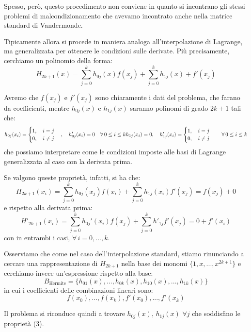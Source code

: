 \documentclass[a4paper,11pt]{article}
\begin{document}
Spesso, però, questo procedimento non conviene in quanto si incontrano gli stessi problemi di malcondizionamento che avevamo incontrato anche nella matrice standard di Vandermonde.

\par\smallskip

Tipicamente allora si procede in maniera analoga all'interpolazione di Lagrange, ma generalizzata per ottenere le condizioni sulle derivate.
Più precisamente, cerchiamo un polinomio della forma:
$$
H_{2k + 1}(x) = \sum_{j = 0}^k h_{0j}(x) f(x_j) + \sum_{j = 0}^k h_{1j}(x) + f'(x_j)
$$

Avremo che $f(x_j)$ e $f'(x_j)$ sono chiaramente i dati del problema, che farano da coefficienti, mentre $h_{0j}(x)$ e $h_{1j}(x)$ saranno polinomi di grado $2k + 1$ tali che:
\begin{equation}
h_{0j}(x_i) =
\begin{cases}
	1, \quad i = j \\
	0, \quad i \neq j
\end{cases}, \quad
h'_{0j}(x_i) = 0  \quad \forall \, 0 \leq i \leq k
$$
$$
h_{1j}(x_i) = 0, \quad
h'_{1j}(x_i) =
\begin{cases}
	1, \quad i = j \\
	0, \quad i \neq j
\end{cases} \quad \forall \, 0 \leq i \leq k
\end{equation}
che possiamo interpretare come le condizioni imposte alle basi di Lagrange generalizzata al caso con la derivata prima.

Se valgono queste proprietà, infatti, si ha che:
$$
H_{2k + 1}(x_i) = \sum_{j = 0}^k h_{0j}(x_j) f(x_i) + \sum_{j = 0}^k h_{1j}(x_i) f'(x_j) = f(x_j) + 0 
$$
e rispetto alla derivata prima:
$$
H'_{2k + 1}(x_i) = \sum_{j = 0}^k h_{0j}'(x_i) f(x_j) + \sum_{j = 0}^k h'_{1j}f'(x_j) = 0 + f'(x_i)
$$
con in entrambi i casi, $\forall \, i = 0, ..., k$.

Osserviamo che come nel caso dell'interpolazione standard, stiamo rinunciando a cercare una rappresentazione di $H_{2k + 1}$ nella base dei monomi $\{ 1, x, ..., x^{2k + 1} \}$ e cerchiamo invece un'espressione rispetto alla base:
$$
	B_\text{Hermite} = \{ h_{01}(x), ..., h_{0k}(x), h_{10}(x), ..., h_{1k}(x) \}
$$
in cui i coefficienti delle combinazioni lineari sono:
$$
f(x_0), ..., f(x_k), f'(x_0), ..., f'(x_k)
$$

Il problema si riconduce quindi a trovare $h_{0j}(x)$, $h_{1j}(x)$ $\forall j$ che soddisfino le proprietà (3).
\end{document}
